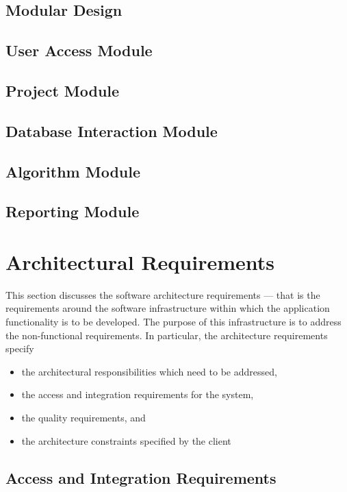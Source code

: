 \documentclass[hidelinks, 12pt, oneside]{article}
\begin{document}
\subsection{Modular Design}

\subsection{User Access Module}

\subsection{Project Module}

\subsection{Database Interaction Module}

\subsection{Algorithm Module}

\subsection{Reporting Module}

\section{Architectural Requirements}
This section discusses the software architecture requirements — that is the requirements around the
software infrastructure within which the application functionality is to be developed. The purpose
of this infrastructure is to address the non-functional requirements. In particular, the architecture
requirements specify
\begin{itemize}
	\item the architectural responsibilities which need to be addressed,
	\item the access and integration requirements for the system,
	\item the quality requirements, and
	\item the architecture constraints specified by the client
\end{itemize}
\subsection{Access and Integration Requirements}

\end{document}

